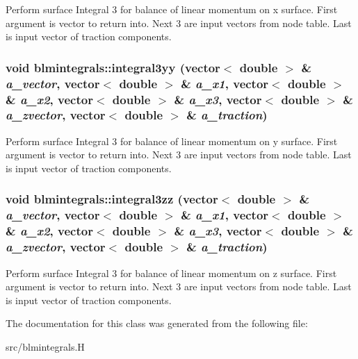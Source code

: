 \label{classblmintegrals_a776e27864b68961f17e93d4465df9e75}
Perform surface Integral 3 for balance of linear momentum on x surface. First argument is vector to return into. Next 3 are input vectors from node table. Last is input vector of traction components. \hypertarget{classblmintegrals_a4ad8f34c8a9cf0f1f05dc385a5ee985a}{
\subsubsection[{integral3yy}]{\setlength{\rightskip}{0pt plus 5cm}void blmintegrals::integral3yy (vector$<$ double $>$ \& {\em a\_\-vector}, \/  vector$<$ double $>$ \& {\em a\_\-x1}, \/  vector$<$ double $>$ \& {\em a\_\-x2}, \/  vector$<$ double $>$ \& {\em a\_\-x3}, \/  vector$<$ double $>$ \& {\em a\_\-zvector}, \/  vector$<$ double $>$ \& {\em a\_\-traction})}}
\label{classblmintegrals_a4ad8f34c8a9cf0f1f05dc385a5ee985a}
Perform surface Integral 3 for balance of linear momentum on y surface. First argument is vector to return into. Next 3 are input vectors from node table. Last is input vector of traction components. \hypertarget{classblmintegrals_aaa8101a80b5b739666cd601565ec4105}{
\subsubsection[{integral3zz}]{\setlength{\rightskip}{0pt plus 5cm}void blmintegrals::integral3zz (vector$<$ double $>$ \& {\em a\_\-vector}, \/  vector$<$ double $>$ \& {\em a\_\-x1}, \/  vector$<$ double $>$ \& {\em a\_\-x2}, \/  vector$<$ double $>$ \& {\em a\_\-x3}, \/  vector$<$ double $>$ \& {\em a\_\-zvector}, \/  vector$<$ double $>$ \& {\em a\_\-traction})}}
\label{classblmintegrals_aaa8101a80b5b739666cd601565ec4105}
Perform surface Integral 3 for balance of linear momentum on z surface. First argument is vector to return into. Next 3 are input vectors from node table. Last is input vector of traction components. 

The documentation for this class was generated from the following file:\begin{DoxyCompactItemize}
\item 
src/blmintegrals.H\end{DoxyCompactItemize}
